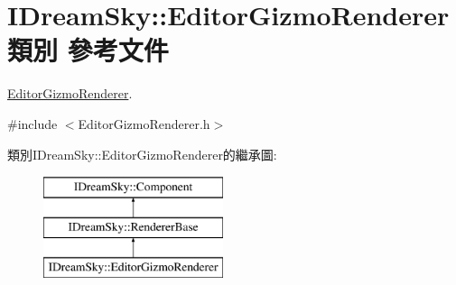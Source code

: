\hypertarget{class_i_dream_sky_1_1_editor_gizmo_renderer}{}\section{I\+Dream\+Sky\+:\+:Editor\+Gizmo\+Renderer 類別 參考文件}
\label{class_i_dream_sky_1_1_editor_gizmo_renderer}


\hyperlink{class_i_dream_sky_1_1_editor_gizmo_renderer}{Editor\+Gizmo\+Renderer}.  




{\ttfamily \#include $<$Editor\+Gizmo\+Renderer.\+h$>$}

類別\+I\+Dream\+Sky\+:\+:Editor\+Gizmo\+Renderer的繼承圖\+:\begin{figure}[H]
\begin{center}
\leavevmode
\includegraphics[height=3.000000cm]{class_i_dream_sky_1_1_editor_gizmo_renderer}
\end{center}
\end{figure}

